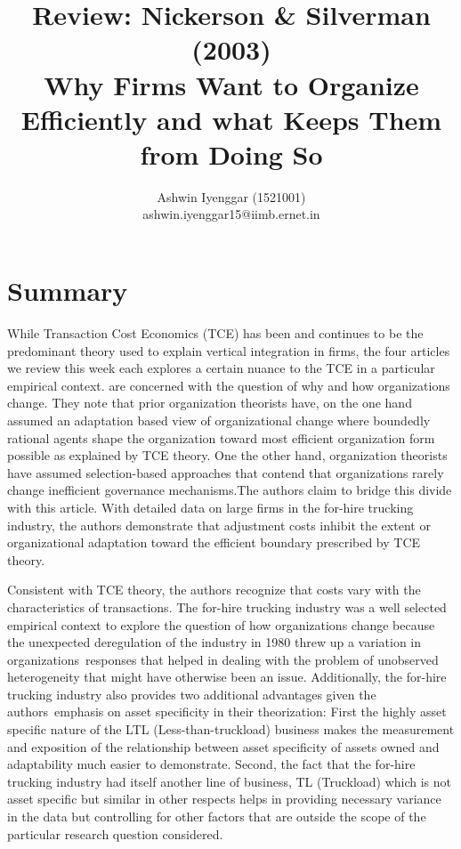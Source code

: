 \documentclass[12pt]{article}
\begin{document}
\title{Review: Nickerson \& Silverman (2003)\\Why Firms Want to Organize Efficiently and what Keeps Them from Doing So}
\author{Ashwin Iyenggar  (1521001) \\ ashwin.iyenggar15@iimb.ernet.in} 


\maketitle
\thispagestyle{empty}

\section{Summary}\label{S:Summary}
While Transaction Cost Economics (TCE) has been and continues to be the predominant theory used to explain vertical integration in firms, the four articles we review this week each explores a certain nuance to the TCE in a particular empirical context. \cite{Nickerson2003} are concerned with the question of why and how organizations change. They note that prior organization theorists have, on the one hand assumed an adaptation based view of organizational change  where boundedly rational agents shape the organization toward most efficient organization form possible as explained by TCE theory. One the other hand, organization theorists have assumed selection-based approaches that contend that organizations rarely change inefficient governance mechanisms.The authors claim to bridge this divide with this article. With detailed data on large firms in the for-hire trucking industry, the authors demonstrate that adjustment costs inhibit the extent or organizational adaptation toward the efficient boundary prescribed by TCE theory.

Consistent with TCE theory, the authors recognize that costs vary with the characteristics of transactions. The for-hire trucking industry was a well selected empirical context to explore the question of how organizations change because the unexpected deregulation of the industry in 1980 threw up a variation in organizations\textquotesingle  \  responses that helped in dealing with the problem of unobserved heterogeneity that might have otherwise been an issue. Additionally, the for-hire trucking industry also provides two additional advantages given the authors\textquotesingle \ emphasis on asset specificity in their theorization: First the highly asset specific nature of the LTL (Less-than-truckload) business makes the measurement and exposition of the relationship between asset specificity of assets owned and adaptability much easier to demonstrate. Second, the fact that the for-hire trucking industry had itself another line of business,  TL (Truckload)  which is not asset specific but similar in other respects helps in providing necessary variance in the data but controlling for other factors that are outside the scope of the particular research question considered.
\end{document}
